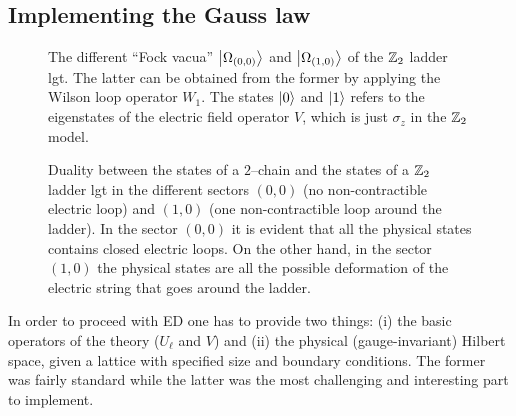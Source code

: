 %
%

\subsection{Implementing the Gauss law}%
\label{sub:implementing_the_gauss_law}

\begin{figure}[t]
    \centering
    
    \caption[Vacuum states of the super-selection sectors of the $\Z_2$ ladder \ac{lgt}]{The different ``Fock vacua'' $\ket{\Omega_{(0,0)}}$ and $\ket{\Omega_{(1,0)}}$ of the $\Z_2$ ladder \ac{lgt}.
        The latter can be obtained from the former by applying the Wilson loop operator $W_1$.
        The states $\ket{0}$ and $\ket{1}$ refers to the eigenstates of the electric field operator $V$, which is just $\sigma_{z}$ in the $\Z_2$ model.
    }
    \label{fig:z2_vacua}
\end{figure}

\begin{figure}
    \centering
    
    \caption[Duality between clock states and ladder states]{Duality between the states of a $2$--chain and the states of a $\Z_2$ ladder \ac{lgt} in the different sectors $(0,0)$ (no non-contractible electric loop) and $(1,0)$ (one non-contractible loop around the ladder).
        In the sector $(0,0)$ it is evident that all the physical states contains closed electric loops.
        On the other hand, in the sector $(1,0)$ the physical states are all the possible deformation of the electric string that goes around the ladder.}
    \label{fig:z2_states}
\end{figure}

In order to proceed with ED one has to provide two things: (i) the basic operators of the theory ($U_{\ell}$ and $V$) and (ii) the physical (gauge-invariant) Hilbert space, given a lattice with specified size and boundary conditions.
The former was fairly standard while the latter was the most challenging and interesting part to implement.


